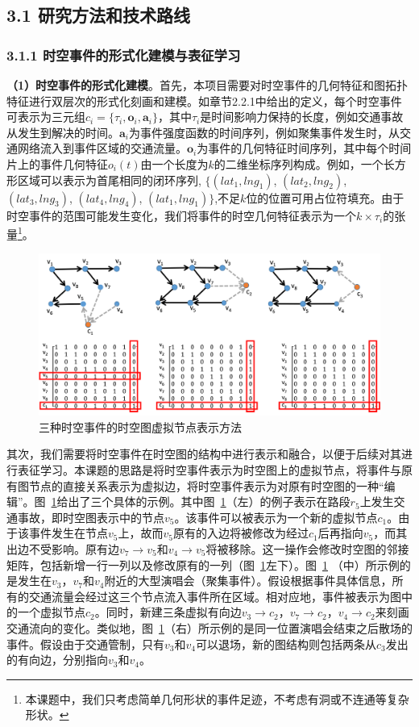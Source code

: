 \documentclass[12pt,UTF8,AutoFakeBold=2,a4paper]{ctexart} %
\begin{document}
\subsection{3.1 研究方法和技术路线}
\subsubsection{3.1.1 时空事件的形式化建模与表征学习}
\textbf{（1）时空事件的形式化建模}。首先，本项目需要对时空事件的几何特征和图拓扑特征进行双层次的形式化刻画和建模。如章节2.2.1中给出的定义，每个时空事件可表示为三元组$c_i = \{\tau_i, \mathbf{o}_i, \mathbf{a}_i\}$，其中$\tau_i$是时间影响力保持的长度，例如交通事故从发生到解决的时间。$\mathbf{a}_i$为事件强度函数的时间序列，例如聚集事件发生时，从交通网络流入到事件区域的交通流量。$\mathbf{o}_i$为事件的几何特征时间序列，其中每个时间片上的事件几何特征$o_i(t)$由一个长度为$k$的二维坐标序列构成。例如，一个长方形区域可以表示为首尾相同的闭环序列, $\{(lat_1, lng_1)$, $(lat_{2}, lng_{2})$, $(lat_3, lng_3)$, $(lat_4, lng_4)$, $(lat_1, lng_1)\}$,不足$k$位的位置可用占位符填充。由于时空事件的范围可能发生变化，我们将事件的时空几何特征表示为一个$k\times \tau_i$的张量\footnote{本课题中，我们只考虑简单几何形状的事件足迹，不考虑有洞或不连通等复杂形状。}。
\begin{figure}[h!]
    \centering
    \includegraphics[width=1\linewidth]{fig/event_graph.png}
    \caption{三种时空事件的时空图虚拟节点表示方法}
    \label{fig:event_graph}
\end{figure}

其次，我们需要将时空事件在时空图的结构中进行表示和融合，以便于后续对其进行表征学习。本课题的思路是将时空事件表示为时空图上的虚拟节点，将事件与原有图节点的直接关系表示为虚拟边，将时空事件表示为对原有时空图的一种``编辑''。图~\ref{fig:event_graph}给出了三个具体的示例。其中图~\ref{fig:event_graph}（左）的例子表示在路段$r_5$上发生交通事故，即时空图表示中的节点$v_5$。该事件可以被表示为一个新的虚拟节点$c_1$。由于该事件发生在节点$v_5$上，故而$v_5$原有的入边将被修改为经过$c_1$后再指向$v_5$，而其出边不受影响。原有边$v_7\rightarrow v_5$和$v_4\rightarrow v_5$将被移除。这一操作会修改时空图的邻接矩阵，包括新增一行一列以及修改原有的一列（图~\ref{fig:event_graph}左下）。图~\ref{fig:event_graph}
（中）所示例的是发生在$v_3$，$v_7$和$v_4$附近的大型演唱会（聚集事件）。假设根据事件具体信息，所有的交通流量会经过这三个节点流入事件所在区域。相对应地，事件被表示为图中的一个虚拟节点$c_2$。同时，新建三条虚拟有向边$v_3\rightarrow c_2$，$v_7\rightarrow c_2$，$v_4\rightarrow c_2$来刻画交通流向的变化。类似地，图~\ref{fig:event_graph}（右）所示例的是同一位置演唱会结束之后散场的事件。假设由于交通管制，只有$v_3$和$v_4$可以退场，新的图结构则包括两条从$c_3$发出的有向边，分别指向$v_3$和$v_4$。
\end{document}
